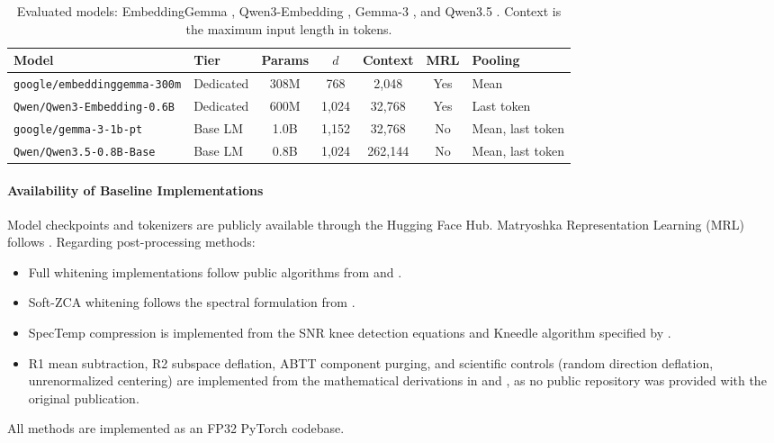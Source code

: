 \begin{table}[t]
\centering
\small
\caption{Evaluated models: EmbeddingGemma \citep{vera-etal-2025-embeddinggemma}, Qwen3-Embedding \citep{zhang-etal-2025-qwen3embedding}, Gemma-3 \citep{gemmateam-2025-gemma3}, and Qwen3.5 \citep{qwenteam-2026-qwen35}. Context is the maximum input length in tokens.}
\label{tab:model_architectures}
\begin{tabular}{llccccl}
\toprule
\textbf{Model} & \textbf{Tier} & \textbf{Params} & \textbf{$d$} & \textbf{Context} & \textbf{MRL} & \textbf{Pooling} \\
\midrule
\texttt{google/embeddinggemma-300m} & Dedicated & 308M & 768 & 2,048 & Yes & Mean \\
\texttt{Qwen/Qwen3-Embedding-0.6B} & Dedicated & 600M & 1,024 & 32,768 & Yes & Last token \\
\texttt{google/gemma-3-1b-pt} & Base LM & 1.0B & 1,152 & 32,768 & No & Mean, last token \\
\texttt{Qwen/Qwen3.5-0.8B-Base} & Base LM & 0.8B & 1,024 & 262,144 & No & Mean, last token \\
\bottomrule
\end{tabular}
\end{table}

\paragraph{Availability of Baseline Implementations}
Model checkpoints and tokenizers are publicly available through the Hugging Face Hub. Matryoshka Representation Learning (MRL) follows \citet{kusupati2022matryoshka}. Regarding post-processing methods:
\begin{itemize}
\item Full whitening implementations follow public algorithms from \citet{su2021whitening} and \citet{huang2021whiteningbert}.
\item Soft-ZCA whitening follows the spectral formulation from \citet{diera2024isotropy}.
\item SpecTemp compression is implemented from the SNR knee detection equations and Kneedle algorithm specified by \citet{li2026spectral}.
\item R1 mean subtraction, R2 subspace deflation, ABTT component purging, and scientific controls (random direction deflation, unrenormalized centering) are implemented from the mathematical derivations in \citet{ren2025correcting} and \citet{mu2018all}, as no public repository was provided with the original publication.
\end{itemize}
All methods are implemented as an FP32 PyTorch codebase.
